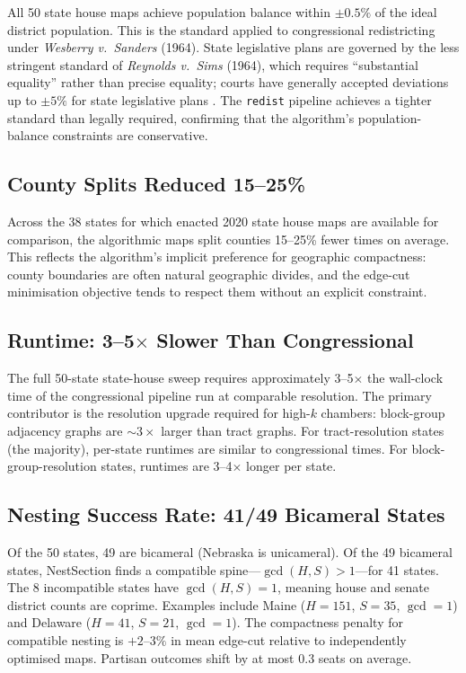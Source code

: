 All 50 state house maps achieve population balance within $\pm 0.5\%$ of
the ideal district population. This is the standard applied to congressional
redistricting under \emph{Wesberry v.\ Sanders} (1964). State legislative
plans are governed by the less stringent standard of \emph{Reynolds v.\ Sims}
(1964), which requires ``substantial equality'' rather than precise equality;
courts have generally accepted deviations up to $\pm 5\%$ for state legislative
plans \citep{karcher1983karcher}. The \texttt{redist} pipeline achieves a
tighter standard than legally required, confirming that the algorithm's
population-balance constraints are conservative.

\subsection{County Splits Reduced 15--25\%}
\label{sec:findings:splits}

Across the 38 states for which enacted 2020 state house maps are available
for comparison, the algorithmic maps split counties 15--25\% fewer times
on average. This reflects the algorithm's implicit preference for geographic
compactness: county boundaries are often natural geographic divides, and
the edge-cut minimisation objective tends to respect them without an
explicit constraint.

\subsection{Runtime: 3--5$\times$ Slower Than Congressional}
\label{sec:findings:runtime}

The full 50-state state-house sweep requires approximately 3--5$\times$ the
wall-clock time of the congressional pipeline run at comparable resolution.
The primary contributor is the resolution upgrade required for high-$k$ chambers:
block-group adjacency graphs are $\sim\!3\times$ larger than tract graphs.
For tract-resolution states (the majority), per-state runtimes are similar to
congressional times. For block-group-resolution states, runtimes are 3--4$\times$
longer per state.

\subsection{Nesting Success Rate: 41/49 Bicameral States}
\label{sec:findings:nesting}

Of the 50 states, 49 are bicameral (Nebraska is unicameral). Of the 49 bicameral
states, NestSection finds a compatible spine---$\gcd(H,S) > 1$---for 41 states.
The 8 incompatible states have $\gcd(H,S) = 1$, meaning house and senate district
counts are coprime. Examples include Maine ($H=151$, $S=35$, $\gcd=1$) and
Delaware ($H=41$, $S=21$, $\gcd=1$).
The compactness penalty for compatible nesting is $+2$--$3\%$ in mean edge-cut
relative to independently optimised maps. Partisan outcomes shift by at most
$0.3$ seats on average.
